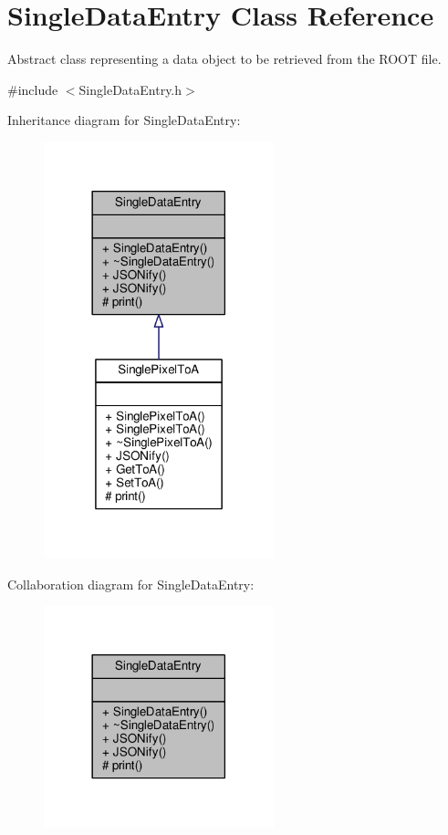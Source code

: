 \hypertarget{classSingleDataEntry}{\section{Single\+Data\+Entry Class Reference}
\label{classSingleDataEntry}
}


Abstract class representing a data object to be retrieved from the R\+O\+O\+T file.  




{\ttfamily \#include $<$Single\+Data\+Entry.\+h$>$}



Inheritance diagram for Single\+Data\+Entry\+:\nopagebreak
\begin{figure}[H]
\begin{center}
\leavevmode
\includegraphics[width=189pt]{classSingleDataEntry__inherit__graph}
\end{center}
\end{figure}


Collaboration diagram for Single\+Data\+Entry\+:\nopagebreak
\begin{figure}[H]
\begin{center}
\leavevmode
\includegraphics[width=189pt]{classSingleDataEntry__coll__graph}
\end{center}
\end{figure}
